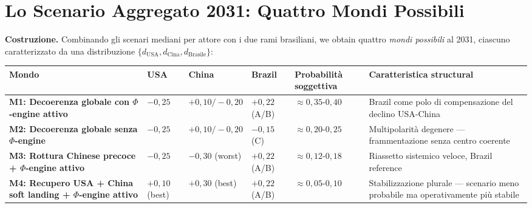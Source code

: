\section{Lo Scenario Aggregato 2031: Quattro Mondi
Possibili}\label{lo-scenario-aggregato-2031-quattro-mondi-possibili}

\Hypoth{} \textbf{Costruzione.} Combinando gli scenari mediani per
attore con i due rami brasiliani, we obtain quattro \emph{mondi
possibili} al 2031, ciascuno caratterizzato da una distribuzione
\(\{d_{\text{USA}}, d_{\text{Cina}}, d_{\text{Brasile}}\}\):

{\def\LTcaptype{none} %
{\small\begin{longtable}[]{@{}
  >{\raggedright\arraybackslash}p{}
  >{\raggedright\arraybackslash}p{}
  >{\raggedright\arraybackslash}p{}
  >{\raggedright\arraybackslash}p{}
  >{\raggedright\arraybackslash}p{}
  >{\raggedright\arraybackslash}p{}@{}}
\toprule\noalign{}
\begin{minipage}[b]{\linewidth}\raggedright
Mondo
\end{minipage} & \begin{minipage}[b]{\linewidth}\raggedright
USA
\end{minipage} & \begin{minipage}[b]{\linewidth}\raggedright
China
\end{minipage} & \begin{minipage}[b]{\linewidth}\raggedright
Brazil
\end{minipage} & \begin{minipage}[b]{\linewidth}\raggedright
Probabilità soggettiva
\end{minipage} & \begin{minipage}[b]{\linewidth}\raggedright
Caratteristica structural
\end{minipage} \\
\midrule\noalign{}
\endhead
\bottomrule\noalign{}
\endlastfoot
\textbf{M1: Decoerenza globale con \(\Phi\)-engine attivo} & \(-0{,}25\)
& \(+0{,}10/-0{,}20\) & \(+0{,}22\) (A/B) &
\(\approx 0{,}35\)-\(0{,}40\) & Brazil come polo di compensazione del
declino USA-China \\
\textbf{M2: Decoerenza globale senza \(\Phi\)-engine} & \(-0{,}25\) &
\(+0{,}10/-0{,}20\) & \(-0{,}15\) (C) & \(\approx 0{,}20\)-\(0{,}25\) &
Multipolarità degenere --- frammentazione senza centro coerente \\
\textbf{M3: Rottura Chinese precoce + \(\Phi\)-engine attivo} &
\(-0{,}25\) & \(-0{,}30\) (worst) & \(+0{,}22\) (A/B) &
\(\approx 0{,}12\)-\(0{,}18\) & Riassetto sistemico veloce, Brazil
reference \\
\textbf{M4: Recupero USA + China soft landing + \(\Phi\)-engine attivo} &
\(+0{,}10\) (best) & \(+0{,}30\) (best) & \(+0{,}22\) (A/B) &
\(\approx 0{,}05\)-\(0{,}10\) & Stabilizzazione plurale --- scenario
meno probabile ma operativamente più stabile \\
\end{longtable}}
}

